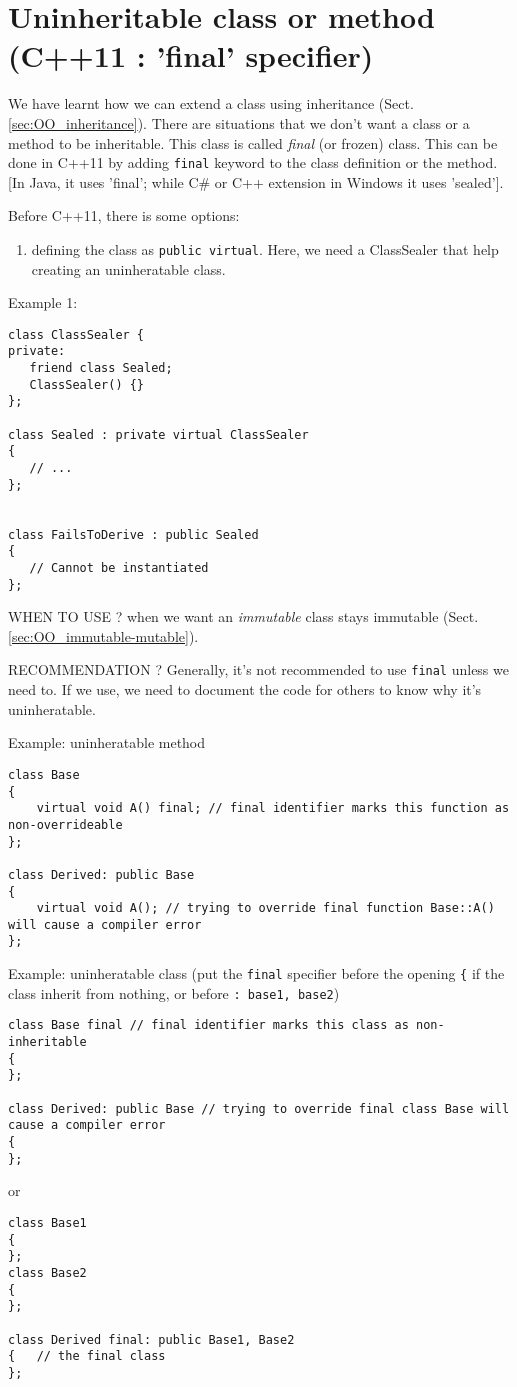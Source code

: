 \section{Uninheritable class or method (C++11 : 'final' specifier)}
\label{sec:OO_uninheritable-class}

We have learnt how we can extend a class using inheritance
(Sect.\ref{sec:OO_inheritance}). There are situations that we don't want a class
or a method to be inheritable. This class is called {\it final} (or frozen)
class. This can be done in C++11 by adding \verb!final! keyword to the class
definition or the method. [In Java, it uses 'final'; while C\# or C++ extension
in Windows it uses 'sealed']. 


Before C++11, there is some options: 
\begin{enumerate}
  \item  defining the class as \verb!public virtual!.  Here, we need a
  ClassSealer that help creating an uninheratable class.
\end{enumerate}

Example 1: 
\begin{Verbatim}
class ClassSealer {
private:
   friend class Sealed;
   ClassSealer() {}
};

class Sealed : private virtual ClassSealer
{ 
   // ...
};


class FailsToDerive : public Sealed
{
   // Cannot be instantiated
};
\end{Verbatim}



WHEN TO USE ? when we want an {\it immutable } class stays immutable
(Sect.\ref{sec:OO_immutable-mutable}).

RECOMMENDATION ? Generally, it's not recommended to use \verb!final! unless we
need to. If we use, we need to document the code for others to know why it's
uninheratable.

Example: uninheratable method
\begin{Verbatim}
class Base
{
    virtual void A() final; // final identifier marks this function as non-overrideable
};
 
class Derived: public Base
{
    virtual void A(); // trying to override final function Base::A() will cause a compiler error
};
\end{Verbatim}


Example: uninheratable class (put the \verb!final! specifier before the opening
\verb!{! if the class inherit from nothing, or before \verb!: base1, base2!)
\begin{Verbatim}
class Base final // final identifier marks this class as non-inheritable
{
};
 
class Derived: public Base // trying to override final class Base will cause a compiler error
{
};
\end{Verbatim}
or
\begin{Verbatim}
class Base1 
{
};
class Base2
{
};
 
class Derived final: public Base1, Base2  
{   // the final class
};


\end{Verbatim}
